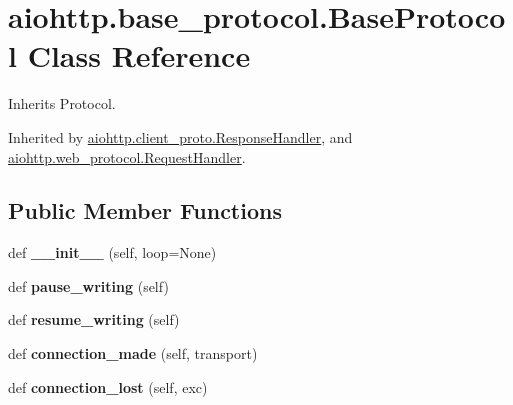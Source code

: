 \hypertarget{classaiohttp_1_1base__protocol_1_1_base_protocol}{}\section{aiohttp.\+base\+\_\+protocol.\+Base\+Protocol Class Reference}
\label{classaiohttp_1_1base__protocol_1_1_base_protocol}


Inherits Protocol.



Inherited by \hyperlink{classaiohttp_1_1client__proto_1_1_response_handler}{aiohttp.\+client\+\_\+proto.\+Response\+Handler}, and \hyperlink{classaiohttp_1_1web__protocol_1_1_request_handler}{aiohttp.\+web\+\_\+protocol.\+Request\+Handler}.

\subsection*{Public Member Functions}
\begin{DoxyCompactItemize}
\item 
\mbox{\label{classaiohttp_1_1base__protocol_1_1_base_protocol_a38a73e45bf4ad67b1e0f4da1bc375f39}} 
def {\bfseries \+\_\+\+\_\+init\+\_\+\+\_\+} (self, loop=None)
\item 
\mbox{\label{classaiohttp_1_1base__protocol_1_1_base_protocol_af320948ab19b3687289405a46ec2d7fc}} 
def {\bfseries pause\+\_\+writing} (self)
\item 
\mbox{\label{classaiohttp_1_1base__protocol_1_1_base_protocol_acfbd2b64241e3d42175c5b971831d0ee}} 
def {\bfseries resume\+\_\+writing} (self)
\item 
\mbox{\label{classaiohttp_1_1base__protocol_1_1_base_protocol_af4a94b0e3654c77a111cb5b98b14df6b}} 
def {\bfseries connection\+\_\+made} (self, transport)
\item 
\mbox{\label{classaiohttp_1_1base__protocol_1_1_base_protocol_abac3fac44e41d17745f5bab7f5d05887}} 
def {\bfseries connection\+\_\+lost} (self, exc)
\end{DoxyCompactItemize}
